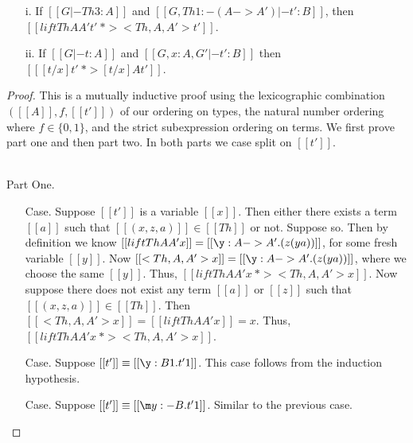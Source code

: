 \begin{lemma}
  \label{lemma:soundness_reduction}  
  \begin{itemize}
  \item[i.] If $[[G |- Th 3 : A]]$ and $[[G, Th 1:{-(A->A')} |- t' : B]]$, then
    $[[lift Th A A' t' ~*> <Th,A,A'>t']]$.
  
  \item[ii.] If $[[G |- t : A]]$ and $[[G, x:A, G' |- t':B]]$ then 
    $[[ [t/x]t' ~*> [t/x] A t']]$.   
  \end{itemize}  
\end{lemma}
\begin{proof}
  This is a mutually inductive proof using the lexicographic combination
  $([[A]], f,[[t']])$ of our ordering on types,
  the natural number ordering where $f \in \{0,1\}$, and
  the strict subexpression ordering on terms. We first prove part one
  and then part two.  In both parts we case split on $[[t']]$.

  \ \\
  \noindent Part One.
  \begin{itemize}
  \item[Case.] Suppose $[[t']]$ is a variable $[[x]]$.  Then either there exists
    a term $[[a]]$ such that $[[(x,z,a)]] \in [[Th]]$ or not.  Suppose so. 
    Then by definition we know $[[lift Th A A' x]] = [[\y:A->A'.(z (y a))]]$,
    for some fresh variable $[[y]]$.  Now $[[<Th,A,A'>x]] = [[\y:A->A'.(z (y a))]]$,
    where we choose the same $[[y]]$.  Thus, $[[lift Th A A' x ~*> <Th,A,A'>x]]$.
    Now suppose there does not exist any term $[[a]]$ or $[[z]]$ such that $[[(x,z,a)]] \in [[Th]]$.
    Then $[[<Th,A,A'>x]] = [[lift Th A A' x]] = x$. Thus, $[[lift Th A A' x ~*> <Th,A,A'>x]]$.

  \item[Case.] Suppose $[[t']] \equiv [[\y:B1.t'1]]$. This case follows from the
    induction hypothesis.

  \item[Case.] Suppose $[[t']] \equiv [[\m y:{-B}.t'1]]$. Similar to the previous case.


\end{itemize}
\end{proof}
